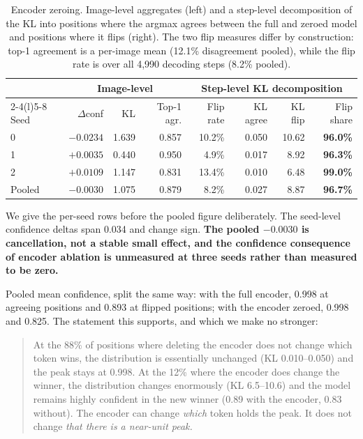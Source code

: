 \documentclass{article}
\begin{document}
\begin{table}[h]
\small
\centering
\caption{Encoder zeroing. Image-level aggregates (left) and a step-level decomposition of the
KL into positions where the argmax agrees between the full and zeroed model and positions
where it flips (right). The two flip measures differ by construction: top-1 agreement is a
per-image mean (12.1\% disagreement pooled), while the flip rate is over all 4{,}990 decoding
steps (8.2\% pooled).}
\label{tab:ablation}
\setlength{\tabcolsep}{4pt}
\begin{tabular}{lrrr@{\hskip 16pt}rrrr}
\toprule
& \multicolumn{3}{c}{Image-level} & \multicolumn{4}{c}{Step-level KL decomposition} \\
\cmidrule(r){2-4}\cmidrule(l){5-8}
Seed & $\Delta$conf & KL & Top-1 agr. & Flip rate & KL agree & KL flip & Flip share \\
\midrule
0 & $-0.0234$ & 1.639 & 0.857 & 10.2\% & 0.050 & 10.62 & \textbf{96.0\%} \\
1 & $+0.0035$ & 0.440 & 0.950 & 4.9\%  & 0.017 & 8.92  & \textbf{96.3\%} \\
2 & $+0.0109$ & 1.147 & 0.831 & 13.4\% & 0.010 & 6.48  & \textbf{99.0\%} \\
\midrule
Pooled & $-0.0030$ & 1.075 & 0.879 & 8.2\% & 0.027 & 8.87 & \textbf{96.7\%} \\
\bottomrule
\end{tabular}
\end{table}

We give the per-seed rows before the pooled figure deliberately. The seed-level confidence
deltas span 0.034 and change sign. \textbf{The pooled $-0.0030$ is cancellation, not a stable
small effect, and the confidence consequence of encoder ablation is unmeasured at three seeds
rather than measured to be zero.}

Pooled mean confidence, split the same way: with the full encoder, 0.998 at agreeing positions
and 0.893 at flipped positions; with the encoder zeroed, 0.998 and 0.825. The statement this
supports, and which we make no stronger:

\begin{quote}
At the 88\% of positions where deleting the encoder does not change which token wins, the
distribution is essentially unchanged (KL 0.010--0.050) and the peak stays at 0.998. At the
12\% where the encoder does change the winner, the distribution changes enormously (KL
6.5--10.6) and the model remains highly confident in the new winner (0.89 with the encoder,
0.83 without). The encoder can change \emph{which} token holds the peak. It does not change
\emph{that there is a near-unit peak.}
\end{quote}
\end{document}
